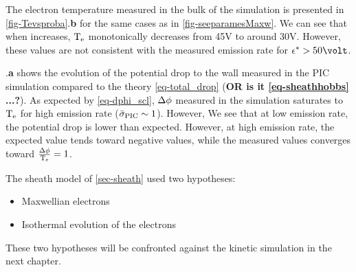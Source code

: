   The electron temperature measured in the bulk of the simulation is presented in \cref{fig-Tevsproba}.{\bf b} for the same cases as in \cref{fig-seeparamesMaxw}.
  We can see that when \rate increases, $\mathrm{T_e}$ monotonically decreases from 45V to around 30V.
  However, these values are not consistent with the measured emission rate \ratepic for $\crover > 50\volt$.

  .{\bf a} shows the evolution of the potential drop to the wall measured in the \ac{PIC} simulation compared to the theory \vref{eq-total_drop} ({\bf OR is it \cref{eq-sheathhobbs} ...?}).
  As expected by \vref{eq-dphi_scl}, $\Delta \phi$ measured in the simulation saturates to $\mathrm{T_e}$ for high emission rate ($ \bar{\sigma }_{\rm PIC} \sim 1$).
  However, 
  We see that at low emission rate, the potential drop is lower than expected.
  However, at high emission rate, the expected value tends toward negative values, while the measured values converges toward $\frac{\Delta \phi}{\mathrm{T_e}} = 1$.
  
  The sheath model of \cref{sec-sheath} used two hypotheses\string:
  \begin{itemize}
    \item Maxwellian electrons
    \item Isothermal evolution of the electrons
  \end{itemize}
  These two hypotheses will be confronted against the kinetic simulation in the next chapter.
  
  
   
